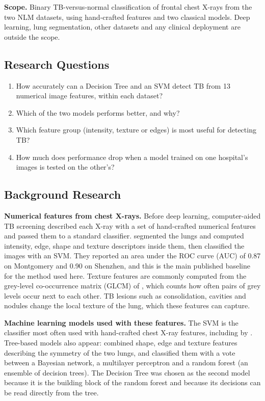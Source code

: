 \documentclass[11pt,a4paper]{article}
\begin{document}
\noindent\textbf{Scope.} Binary TB-versus-normal classification of frontal chest X-rays from the two NLM datasets, using hand-crafted features and two classical models. Deep learning, lung segmentation, other datasets and any clinical deployment are outside the scope.

\subsection{Research Questions}
\begin{enumerate}\itemsep2pt
  \item How accurately can a Decision Tree and an SVM detect TB from 13 numerical image features, within each dataset?
  \item Which of the two models performs better, and why?
  \item Which feature group (intensity, texture or edges) is most useful for detecting TB?
  \item How much does performance drop when a model trained on one hospital's images is tested on the other's?
\end{enumerate}

\subsection{Background Research}
\noindent\textbf{Numerical features from chest X-rays. }Before deep learning, computer-aided TB screening described each X-ray with a set of hand-crafted numerical features and passed them to a standard classifier. \citet{jaeger2014tmi} segmented the lungs and computed intensity, edge, shape and texture descriptors inside them, then classified the images with an SVM. They reported an area under the ROC curve (AUC) of 0.87 on Montgomery and 0.90 on Shenzhen, and this is the main published baseline for the method used here. Texture features are commonly computed from the grey-level co-occurrence matrix (GLCM) of \citet{haralick1973}, which counts how often pairs of grey levels occur next to each other. TB lesions such as consolidation, cavities and nodules change the local texture of the lung, which these features can capture.

\noindent\textbf{Machine learning models used with these features. }The SVM \citep{cortes1995} is the classifier most often used with hand-crafted chest X-ray features, including by \citet{jaeger2014tmi}. Tree-based models also appear: \citet{santosh2018} combined shape, edge and texture features describing the symmetry of the two lungs, and classified them with a vote between a Bayesian network, a multilayer perceptron and a random forest (an ensemble of decision trees). The Decision Tree \citep{breiman1984} was chosen as the second model because it is the building block of the random forest and because its decisions can be read directly from the tree.
\end{document}
